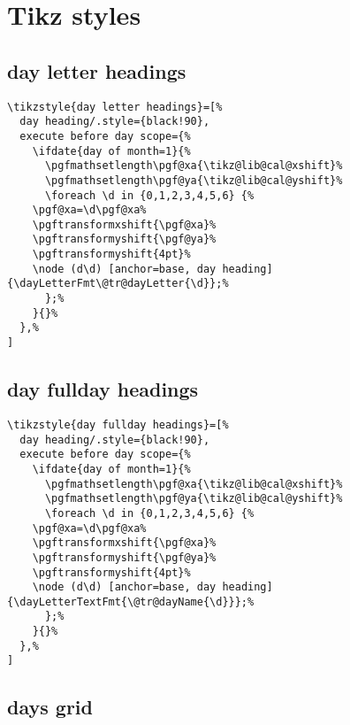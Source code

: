 \documentclass[11pt,oneside]{memoir-article}
\begin{document}
\section{Tikz styles}
\label{sec:org7e04f26}
\subsection{day letter headings}
\label{sec:org31e5dbf}

\begin{verbatim}
\tikzstyle{day letter headings}=[%
  day heading/.style={black!90},
  execute before day scope={%
    \ifdate{day of month=1}{%
      \pgfmathsetlength\pgf@xa{\tikz@lib@cal@xshift}%
      \pgfmathsetlength\pgf@ya{\tikz@lib@cal@yshift}%
      \foreach \d in {0,1,2,3,4,5,6} {%
	\pgf@xa=\d\pgf@xa%
	\pgftransformxshift{\pgf@xa}%
	\pgftransformyshift{\pgf@ya}%
	\pgftransformyshift{4pt}%
	\node (d\d) [anchor=base, day heading] {\dayLetterFmt\@tr@dayLetter{\d}};%
      };%
    }{}%
  },%
]
\end{verbatim}

\subsection{day fullday headings}
\label{sec:orgd52ff06}

\begin{verbatim}
\tikzstyle{day fullday headings}=[%
  day heading/.style={black!90},
  execute before day scope={%
    \ifdate{day of month=1}{%
      \pgfmathsetlength\pgf@xa{\tikz@lib@cal@xshift}%
      \pgfmathsetlength\pgf@ya{\tikz@lib@cal@yshift}%
      \foreach \d in {0,1,2,3,4,5,6} {%
	\pgf@xa=\d\pgf@xa%
	\pgftransformxshift{\pgf@xa}%
	\pgftransformyshift{\pgf@ya}%
	\pgftransformyshift{4pt}%
	\node (d\d) [anchor=base, day heading] {\dayLetterTextFmt{\@tr@dayName{\d}}};%
      };%
    }{}%
  },%
]
\end{verbatim}

\subsection{days grid}
\label{sec:orgebe4156}
\end{document}
